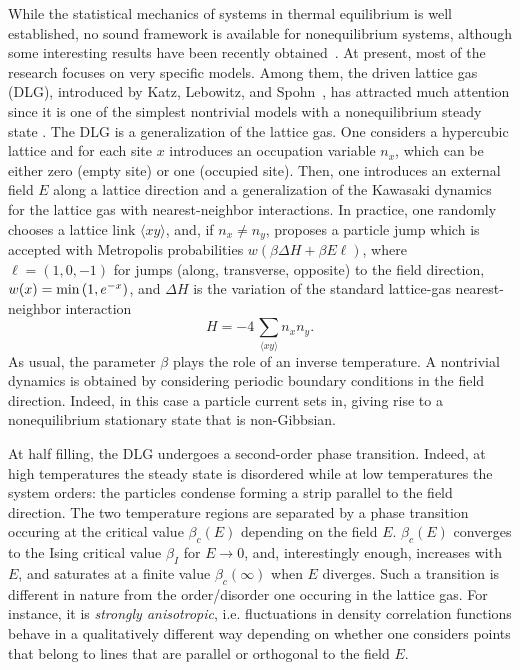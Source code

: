 \documentclass[aps,prl,twocolumn,floatfix,amssymb]{revtex4}
\begin{document}
While the statistical mechanics of systems in thermal equilibrium is 
well established, no sound framework is available for nonequilibrium 
systems, although some interesting results have been 
recently obtained~\cite{Derrida}. 
At present, most of the research focuses on very specific models. 
Among them, the driven lattice gas (DLG), introduced by 
Katz, Lebowitz, and Spohn~\cite{KLS}, has attracted much attention 
since it is one of the simplest nontrivial models with a nonequilibrium 
steady state \cite{Zia}. The DLG is a generalization of the lattice gas. 
One considers a hypercubic lattice and for each site $x$ introduces an occupation 
variable $n_{x}$, which can be either zero (empty site) 
or one (occupied site). Then, one introduces an external field 
$E$ along a lattice direction and 
a generalization of the Kawasaki dynamics for the lattice gas with 
nearest-neighbor interactions. In practice, one randomly chooses a lattice 
link $\langle xy\rangle$, and, if $n_{x}\not= n_y$, proposes a particle 
jump which is accepted with Metropolis probabilities $w(\beta \Delta H + \beta E \ell)$, where $\ell = (1,0,-1)$ for jumps (along, transverse, opposite) to the 
field direction, $w(x) = \hbox{\rm min}\, (1,e^{-x})$, 
 and $\Delta H$ is the variation of the standard lattice-gas nearest-neighbor interaction 
\begin{equation} 
H = - 4\,\sum_{\langle xy\rangle} n_x n_y. 
\end{equation} 
As usual, the 
parameter $\beta$ plays the role of an inverse temperature. A nontrivial 
dynamics is obtained by considering periodic boundary conditions 
in the field direction. Indeed, in this case a particle current sets in, 
giving rise to a nonequilibrium stationary state that is non-Gibbsian. 
 
At half filling, the DLG undergoes a second-order phase transition. 
Indeed, at high temperatures the steady state is disordered while at low 
temperatures the system orders: the particles condense forming a strip 
parallel to the field direction. 
The two temperature regions are separated by a phase transition 
occuring at the critical value $\beta_c(E)$ depending on the field $E$. 
$\beta_c(E)$ converges to the Ising critical value $\beta_I$ for $E\to 0$, and, interestingly enough, increases with $E$, and 
saturates at a finite value $\beta_{c}(\infty)$ when $E$ diverges. 
Such a transition is different in nature from the order/disorder one 
occuring in the lattice gas. For instance, 
it is {\em strongly anisotropic}, i.e. fluctuations in 
density correlation functions behave in a 
qualitatively different way depending on whether one considers points 
that belong to lines that are parallel or orthogonal to the field $E$. 
 
\end{document}
